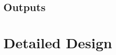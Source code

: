 \documentclass[11pt,a4paper]{article}
\begin{document}
\subsection{Outputs}

\section{Detailed Design}
\end{document}

